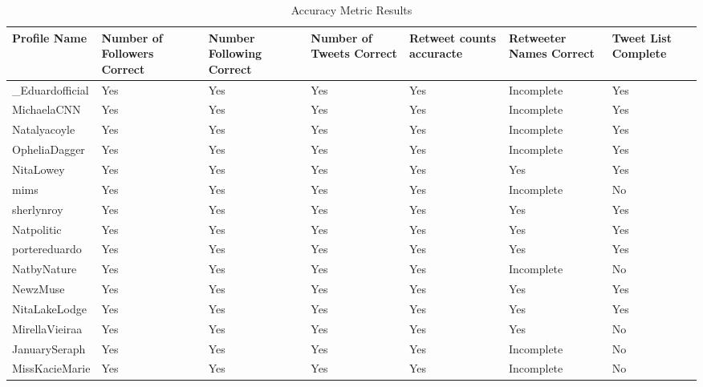 \begin{table}
\begin{center}
 \begin{tabular}{| p{3cm} | p{3cm}| p{3cm} | p{3cm} | p{3cm} | p{3cm} | p{2cm} |}
 \hline
 \textbf{Profile Name} & \textbf{Number of Followers Correct} & \textbf{Number Following Correct} & \textbf{Number of Tweets Correct} & \textbf{Retweet counts accuracte} & \textbf{Retweeter Names Correct} & \textbf{Tweet List Complete}\\ \hline
\_Eduardofficial & Yes & Yes & Yes & Yes & Incomplete & Yes\\ \hline
 MichaelaCNN & Yes & Yes & Yes & Yes & Incomplete & Yes \\ \hline
 Natalyacoyle & Yes & Yes & Yes & Yes & Incomplete & Yes \\ \hline
 OpheliaDagger & Yes & Yes & Yes & Yes & Incomplete & Yes \\ \hline
 NitaLowey & Yes & Yes & Yes & Yes & Yes & Yes  \\ \hline
 mims & Yes & Yes & Yes & Yes & Incomplete & No \\ \hline
 sherlynroy & Yes & Yes & Yes & Yes & Yes & Yes \\ \hline
 Natpolitic & Yes & Yes & Yes & Yes & Yes & Yes \\ \hline
 portereduardo & Yes & Yes & Yes & Yes & Yes & Yes \\ \hline
 NatbyNature & Yes & Yes & Yes & Yes & Incomplete & No \\ \hline
 NewzMuse & Yes & Yes & Yes & Yes & Yes & Yes \\ \hline
 NitaLakeLodge & Yes & Yes & Yes & Yes & Yes & Yes \\ \hline
 MirellaVieiraa & Yes & Yes & Yes & Yes & Yes & No \\ \hline
 JanuarySeraph & Yes & Yes & Yes & Yes & Incomplete & No \\ \hline
 MissKacieMarie & Yes & Yes & Yes & Yes & Incomplete & No \\ \hline
 \end{tabular}
\end{center}
\caption{Accuracy Metric Results}
\label{tab:accuracy_result}
\end{table}


